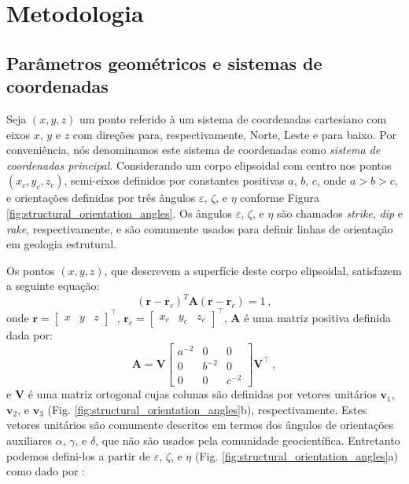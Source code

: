 \chapter{Metodologia}

\section{Parâmetros geométricos e sistemas de coordenadas}

Seja $(x, y, z)$ um ponto referido à um sistema de coordenadas cartesiano com eixos $x$, $y$ e $z$ com direções para, respectivamente, Norte, Leste e para baixo. Por conveniência, nós denominamos este sistema de coordenadas como \textit{sistema de coordenadas principal}.
Considerando um corpo elipsoidal com centro nos pontos $(x_{c}, y_{c}, z_{c})$, semi-eixos definidos por constantes positivas $a$, $b$, $c$, 
onde $a > b > c$, e orientações definidas por três ângulos $\varepsilon$, $\zeta$, e $\eta$ conforme Figura \ref{fig:structural_orientation_angles}. Os ângulos $\varepsilon$, $\zeta$, e $\eta$ são chamados \textit{strike}, \textit{dip} e \textit{rake}, respectivamente, e são comumente usados para definir linhas de orientação em geologia estrutural\citep{clark1986, allmendinger2012}. 

Os pontos $(x, y, z)$, que descrevem a superfície deste corpo elipsoidal, satisfazem a seguinte equação:
\begin{equation}
(\mathbf{r} - \mathbf{r}_c)^T \mathbf{A} (\mathbf{r} - \mathbf{r}_c) = 1 \: ,
\label{eq:ellipsoid_surface}
\end{equation}
onde $\mathbf{r} = [\begin{array}{ccc} x & y & z \end{array} ]^{\top}$,
$\mathbf{r}_{c} = [\begin{array}{ccc} x_{c} & y_{c} & z_{c} \end{array} ]^{\top}$,
$\mathbf{A}$ é uma matriz positiva definida dada por:
\begin{equation}
\mathbf{A} = \mathbf{V}
\left[ \begin{array}{ccc}
a^{-2} & 0 & 0 \\
0 & b^{-2} & 0 \\
0 & 0 & c^{-2} 
\end{array} \right] \mathbf{V}^{\top} \: ,
\label{eq:A}
\end{equation}
e $\mathbf{V}$ é uma matriz ortogonal cujas colunas são definidas por vetores unitários $\mathbf{v}_{1}$, $\mathbf{v}_{2}$, e $\mathbf{v}_{3}$ (Fig. \ref{fig:structural_orientation_angles}b), respectivamente. Estes vetores unitários são comumente descritos em termos dos ângulos de orientações auxiliares $\alpha$, $\gamma$, e $\delta$, que não são usados pela comunidade geocientífica. Entretanto podemos defini-los a partir de $\varepsilon$, $\zeta$, e $\eta$ (Fig. \ref{fig:structural_orientation_angles}a) como dado por \citep{clark1986}:

